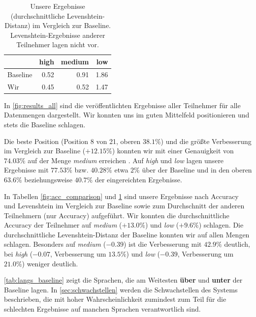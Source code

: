 \documentclass[a4paper]{article}
\begin{document}
\begin{table}
\centering
\begin{tabular}{lrrr}
\toprule
         & high & medium & low  \\
         \midrule
Baseline & 0.52 & 0.91   & 1.86 \\
Wir      & 0.45 & 0.52   & 1.47\\
\bottomrule
\end{tabular}
\caption{Unsere Ergebnisse (durchschnittliche Levenshtein-Distanz) im Vergleich zur Baseline. Levenshtein-Ergebnisse anderer Teilnehmer lagen nicht vor.}
\label{fig:lev_comparison}
\end{table}

In \autoref{fig:results_all} sind die veröffentlichten Ergebnisse aller Teilnehmer für alle Datenmengen dargestellt. Wir konnten uns im guten Mittelfeld positionieren und stets die Baseline schlagen.

Die beste Position (Position 8 von 21, oberen $38.1\%$) und die größte Verbesserung im Vergleich zur Baseline ($+12.15\%$) konnten wir mit einer Genauigkeit von $74.03\%$ auf der Menge \textit{medium} erreichen . Auf \textit{high} und \textit{low} lagen unsere Ergebnisse mit $77.53\%$ bzw. $40.28\%$ etwa $2\%$ über der Baseline und in den oberen $63.6\%$ beziehungsweise $40.7\%$ der eingereichten Ergebnisse.

In Tabellen \ref{fig:acc_comparison} und \ref{fig:lev_comparison} sind unsere Ergebnisse nach Accuracy und Levenshtein im Vergleich zur Baseline sowie zum Durchschnitt der anderen Teilnehmern (nur Accuracy) aufgeführt. Wir konnten die durchschnittliche Accuracy der Teilnehmer auf \textit{medium} ($+13.0\%$) und \textit{low} ($+9.6\%$) schlagen. Die durchschnittliche Levenshtein-Distanz der Baseline konnten wir auf allen Mengen schlagen. Besonders auf \textit{medium} ($-0.39$) ist die Verbesserung mit $42.9\%$ deutlich, bei \textit{high} ($-0.07$, Verbesserung um $13.5\%$) und \textit{low} ($-0.39$, Verbesserung um $21.0\%$) weniger deutlich.

\autoref{tab:langs_baseline} zeigt die Sprachen, die am Weitesten \textbf{über} und \textbf{unter} der Baseline lagen. In \autoref{sec:schwachstellen} werden die Schwachstellen des Systems beschrieben, die mit hoher Wahrscheinlichkeit zumindest zum Teil für die schlechten Ergebnisse auf manchen Sprachen verantwortlich sind.
\end{document}
